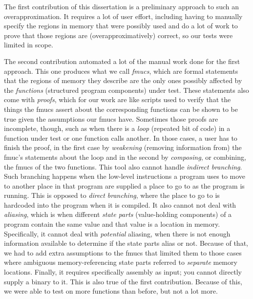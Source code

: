 {  The first contribution of this dissertation is a preliminary approach to such an overapproximation.
  It requires a lot of user effort, including having to manually specify the regions in memory that were possibly used and do a lot of work to prove that those regions are (overapproximatively) correct, so our tests were limited in scope.

  The second contribution automated a lot of the manual work done for the first approach.
  This one produces what we call \emph{\acfp{fmuc}}, which are formal statements that the regions of memory they describe are the only ones possibly affected by the \emph{functions} (structured program components) under test.
  These statements also come with \emph{proofs}, which for our work are like scripts used to verify that the things the \acp{fmuc} assert about the corresponding functions can be shown to be true given the assumptions our \acp{fmuc} have.
  Sometimes those proofs are incomplete, though, such as when there is a \emph{loop} (repeated bit of code) in a function under test or one function calls another.
  In those cases, a user has to finish the proof, in the first case by \emph{weakening} (removing information from) the \ac{fmuc}'s statements about the loop and in the second by \emph{composing}, or combining, the \acp{fmuc} of the two functions.
  This tool also cannot handle \emph{indirect branching}.
  Such branching happens when the low-level instructions a program uses to move to another place in that program are supplied a place to go to as the program is running.
  This is opposed to \emph{direct branching}, where the place to go to is hardcoded into the program when it is compiled.
  It also cannot not deal with \emph{aliasing}, which is when different \emph{state parts} (value-holding components) of a program contain the same value and that value is a location in memory.
  Specifically, it cannot deal with \emph{potential} aliasing, when there is not enough information available to determine if the state parts alias or not.
  Because of that, we had to add extra assumptions to the \acp{fmuc} that limited them to those cases where ambiguous memory-referencing state parts referred to \emph{separate} memory locations.
  Finally, it requires specifically assembly as input; you cannot directly supply a binary to it.
  This is also true of the first contribution.
  Because of this, we were able to test on more functions than before, but not a lot more.

}
